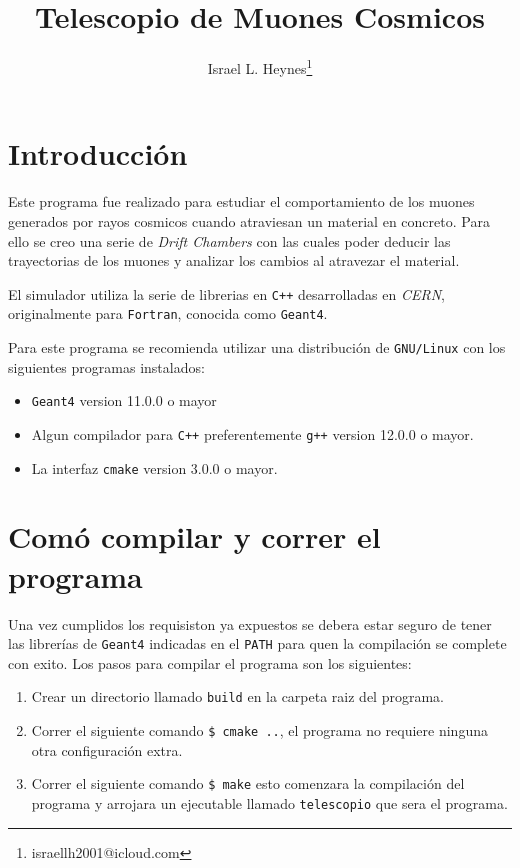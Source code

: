 \documentclass[a4paper,10pt]{article}
\author{Israel L. Heynes\thanks{israellh2001@icloud.com}}
\title{Telescopio de Muones Cosmicos}
\begin{document}
    \maketitle
    \tableofcontents

    \section{Introducción}

	Este programa fue realizado para estudiar el comportamiento de los muones generados por rayos cosmicos cuando atraviesan un material en concreto. Para ello se creo una serie de \emph{Drift Chambers} con las cuales poder deducir las trayectorias de los muones y analizar los cambios al atravezar el material.

	El simulador utiliza la serie de librerias en \verb|C++| desarrolladas en \emph{CERN}, originalmente para \verb|Fortran|, conocida como \verb|Geant4|.

	Para este programa se recomienda utilizar una distribución de \verb|GNU/Linux| con los siguientes programas instalados:

	\begin{itemize}
		\item \verb|Geant4| version 11.0.0 o mayor
		\item Algun compilador para \verb|C++| preferentemente \verb|g++| version 12.0.0 o mayor.
		\item La interfaz \verb|cmake| version 3.0.0 o mayor.
	\end{itemize}

    \section{Comó compilar y correr el programa}
    	Una vez cumplidos los requisiston ya expuestos se debera estar seguro de tener las librerías de \verb|Geant4| indicadas en el \verb|PATH| para quen la compilación se complete con exito. Los pasos para compilar el programa son los siguientes:

	\begin{enumerate}
		\item Crear un directorio llamado \verb|build| en la carpeta raiz del programa.
		\item Correr el siguiente comando \verb|$ cmake ..|, el programa no requiere ninguna otra configuración extra.
		\item Correr el siguiente comando \verb|$ make| esto comenzara la compilación del programa y arrojara un ejecutable llamado \verb|telescopio| que sera el programa.
	\end{enumerate}
\end{document}

